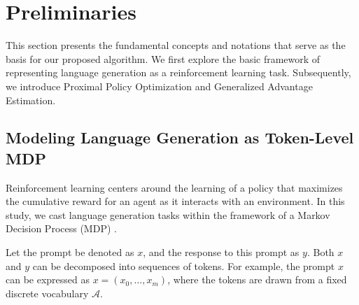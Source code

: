 

\section{Preliminaries}
This section presents the fundamental concepts and notations that serve as the basis for our proposed algorithm. We first explore the basic framework of representing language generation as a reinforcement learning task. Subsequently, we introduce Proximal Policy Optimization and Generalized Advantage Estimation.

\subsection{Modeling Language Generation as Token-Level MDP}
Reinforcement learning centers around the learning of a policy that maximizes the cumulative reward for an agent as it interacts with an environment. In this study, we cast language generation tasks within the framework of a Markov Decision Process (MDP) \citep{ouyang2022training}.

Let the prompt be denoted as $x$, and the response to this prompt as $y$. Both $x$ and $y$ can be decomposed into sequences of tokens. For example, the prompt $x$ can be expressed as $x=(x_0,\dots,x_m)$, where the tokens are drawn from a fixed discrete vocabulary $\mathcal{A}$.

